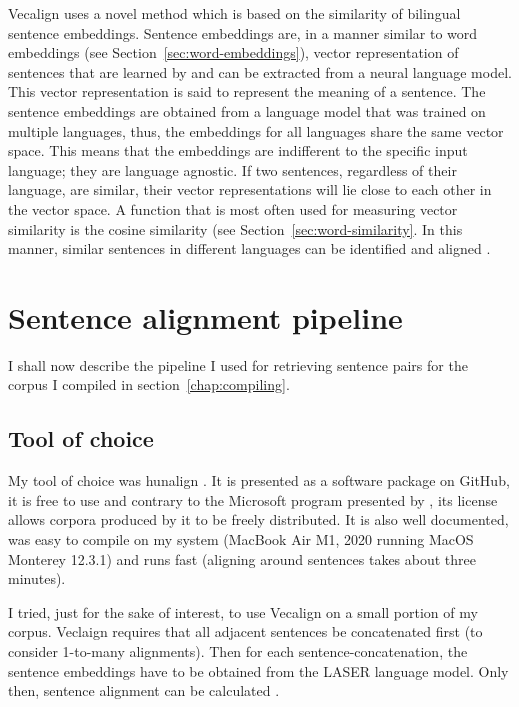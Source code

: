 Vecalign uses a novel method which is based on the similarity of bilingual sentence embeddings. 
Sentence embeddings are, in a manner similar to word embeddings (see Section~\ref{sec:word-embeddings}), vector representation of sentences that are learned by and can be extracted from a neural language model. 
This vector representation is said to represent the meaning of a sentence. 
The sentence embeddings are obtained from a language model that was trained on multiple languages, thus, the embeddings for all languages share the same vector space.
This means that the embeddings are indifferent to the specific input language; they are language agnostic.
If two sentences, regardless of their language, are similar, their vector representations will lie close to each other in the vector space. 
A function that is most often used for measuring vector similarity is the cosine similarity (see Section~\ref{sec:word-similarity}.
In this manner, similar sentences in different languages can be identified and aligned \autocite{artexte-schwenk-2019-laser}.


\section{Sentence alignment pipeline}

I shall now describe the pipeline I used for retrieving sentence pairs for the corpus I compiled in section~\ref{chap:compiling}.

\subsection{Tool of choice}
\label{subsec:tool}
My tool of choice was hunalign \autocite{hunalign}. 
It is presented as a software package on GitHub, it is free to use and contrary to the Microsoft program presented by \cite{moore2002fast}, its license allows corpora produced by it to be freely distributed. 
It is also well documented, was easy to compile on my system (MacBook Air M1, 2020 running MacOS Monterey 12.3.1) and runs fast (aligning around  sentences takes about three minutes). 

I tried, just for the sake of interest, to use Vecalign on a small portion of my corpus. 
Veclaign requires that all adjacent sentences be concatenated first (to consider 1-to-many alignments). 
Then for each sentence-concatenation, the sentence embeddings have to be obtained from the LASER language model. 
Only then, sentence alignment can be calculated \autocite{thompson-koehn-2019-vecalign}. 

